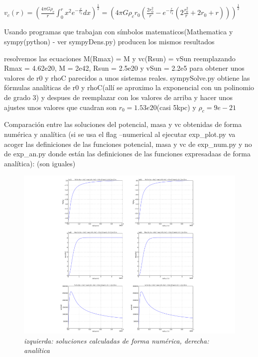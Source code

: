 \documentclass[12pt]{book}
\begin{document}
\begin{description}
\item $v_c(r) = (\frac{4 \pi G \rho_c}{r}\int_0^r{x^2 e^{-\frac{x}{r_0}}dx} )^{\frac{1}{2}}   
= (4 \pi G \rho_c r_0 (\frac{2 r_0^2}{r} -  e^{-\frac{r}{r_0}} (2 \frac{r_0^2}{r} +  2 r_0 + r) ))^{\frac{1}{2}} $


\item Usando programas que trabajan con símbolos matematicos(Mathematica y sympy(python) -  ver sympyDens.py) producen los mismos resultados 
\item resolvemos las ecuaciones M(Rmax) = M y vc(Rsun) = vSun reemplazando Rmax = 4.62e20, M = 2e42, Rsun = 2.5e20 y vSun = 2.2e5 para obtener unos valores de r0 y rhoC parecidos a unos sistemas reales. 
sympySolve.py obtiene las fórmulas analíticas de r0 y rhoC(allí se aproximo la exponencial con un polinomio de grado 3) y despues de reemplazar con los valores de arriba y hacer unos ajustes unos valores que cuadran son $r_0 = 1.53e20$(casi 5kpc) y $\rho_c = 9e-21$

\item Comparación entre las soluciones del potencial, masa y vc  obtenidas de forma numérica y analítica (si se usa el flag --numerical al ejecutar exp\_plot.py va  acoger las definiciones de las funciones potencial, masa y vc de exp\_num.py y no de exp\_an.py donde están las definiciones de las funciones expresadaas de forma analítica):
(son iguales)

\begin{figure}[!ht]
 \centering
 \includegraphics[scale=0.7]{allNumAn.png}
 \caption{\emph{izquierda: soluciones calculadas de forma numérica, derecha: analítica}}
\end{figure}

\end{description}
\end{document}
